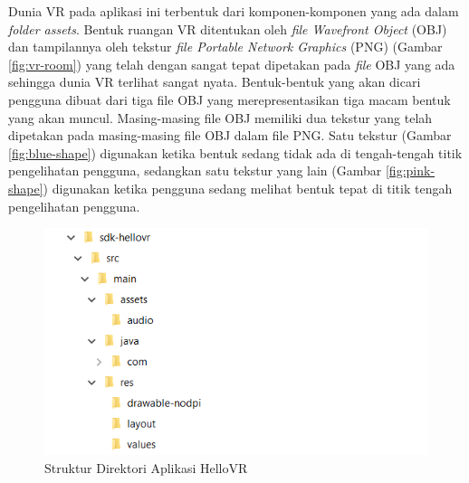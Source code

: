 Dunia VR pada aplikasi ini terbentuk dari komponen-komponen yang ada dalam \textit{folder assets}. Bentuk ruangan VR ditentukan oleh {\it file Wavefront Object} (OBJ) dan tampilannya oleh tekstur {\it file Portable Network Graphics} (PNG) (Gambar \ref{fig:vr-room}) yang telah dengan sangat tepat dipetakan pada \textit{file} OBJ yang ada sehingga dunia VR terlihat sangat nyata. Bentuk-bentuk yang akan dicari pengguna dibuat dari tiga file OBJ yang merepresentasikan tiga macam bentuk yang akan muncul. Masing-masing file OBJ memiliki dua tekstur yang telah dipetakan pada masing-masing file OBJ dalam file PNG. Satu tekstur (Gambar \ref{fig:blue-shape}) digunakan ketika bentuk sedang tidak ada di tengah-tengah titik pengelihatan pengguna, sedangkan satu tekstur yang lain (Gambar \ref{fig:pink-shape}) digunakan ketika pengguna sedang melihat bentuk tepat di titik tengah pengelihatan pengguna.

\begin{figure}[h]
	\centering
		\includegraphics[scale=1.0]{Gambar/hello_vr_dir.png}
	\caption{Struktur Direktori Aplikasi HelloVR}
	\label{fig:hello-vr-dir}
\end{figure}

